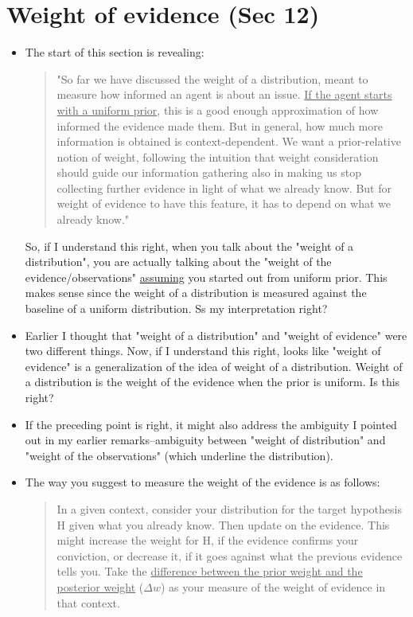 \documentclass[
  10pt,
  dvipsnames,enabledeprecatedfontcommands]{scrartcl}
\begin{document}
\hypertarget{weight-of-evidence-sec-12}{%
\section{Weight of evidence (Sec 12)}\label{weight-of-evidence-sec-12}}

\begin{itemize}

\item The start of this section is revealing:

\begin{quote}
"So far we have discussed the weight of a distribution, meant to measure how informed an agent is about an issue. \underline{If the agent starts with a uniform prior}, this is a good enough approximation of how informed the evidence made them. But in general, how much more information is obtained is context-dependent. We want a prior-relative notion of weight, following the intuition that weight consideration should guide our information gathering also in making us stop collecting further evidence in light of what we already know. But for weight of evidence to have this feature, it has to depend on what we already know."
\end{quote}

So, if I understand this right, when you talk about the "weight of a distribution", you are actually talking about the "weight of the evidence/observations" \underline{assuming} you started out from uniform prior. This makes sense since the weight of a distribution is measured against the baseline of a uniform distribution. Ss my interpretation right?


\item Earlier I thought that "weight of a distribution" and "weight of evidence" were two different things.
Now, if I understand this right, looks like "weight of evidence" is a generalization of the 
idea of weight of a distribution. Weight of a distribution is the weight of the 
evidence when the prior is uniform. Is this right?

\item If the preceding point is right, it might also address the ambiguity I pointed out in my earlier remarks--ambiguity between "weight of distribution" and "weight of the observations" (which underline the distribution).

\item The way you suggest to measure the weight of the evidence is as follows:

\begin{quote}
In a given context, consider your distribution for the target hypothesis H given what you already know. Then update on the evidence. This might increase the weight for H, if the evidence confirms your conviction, or decrease it, if it goes against what the previous evidence tells you. Take the \underline{difference between the prior weight and the posterior weight} ($\Delta w$) as your measure of the weight of evidence in that context. 
\end{quote}


\end{itemize}
\end{document}
